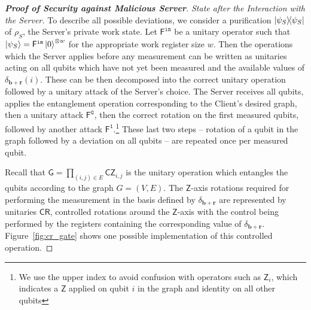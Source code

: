 \documentclass[12pt]{iopart}
\newcommand{\cptp}[1]{\mathsf{#1}} \newcommand{\pd}[1]{\mathcal{#1}}  \newcommand{\sch}[1]{\bm{#1}}
\newcommand{\Z}{\cptp{Z}}
\renewcommand{\1}{\mathds{1}}
\newcommand{\CZ}{\mathsf{CZ}}
\newcommand{\CR}{\mathsf{CR}}
\begin{document}
\begin{proof}[\bf Proof of Security against Malicious Server]
\textit{State after the Interaction with the Server.}
To describe all possible deviations, we consider a purification $\dyad{\psi_S}$ of $\rho_S$, the Server's private work state. Let $\cptp F^{\mathtt{in}}$ be a unitary operator such that $\ket{\psi_S} = \cptp F^{\mathtt{in}} \ket{0}^{\otimes w}$ for the appropriate work register size $w$. Then the operations which the Server applies before any measurement can be written as unitaries acting on all qubits which have not yet been measured and the available values of $\delta_{\bm{b} + \bm{r}}(i)$. These can be then decomposed into the correct unitary operation followed by a unitary attack of the Server's choice. The Server receives all qubits, applies the entanglement operation corresponding to the Client's desired graph, then a unitary attack $\cptp F^{\mathtt{G}}$, then the correct rotation on the first measured qubits, followed by another attack $\cptp F^{\mathtt{1}}$.\footnote{We use the upper index to avoid confusion with operators such as $\Z_i$, which indicates a $\Z$ applied on qubit $i$ in the graph and  identity on all other qubits} These last two steps -- rotation of a qubit in the graph followed by a deviation on all qubits -- are repeated once per measured qubit.

Recall that $\cptp G = \prod_{(i, j) \in E} \CZ_{i, j}$ is the unitary operation which entangles the qubits according to the graph $G = (V, E)$. The $\Z$-axis rotations required for performing the measurement in the basis defined by $\delta_{\bm{b} + \bm{r}}$ are represented by unitaries $\CR$, controlled rotations around the $\Z$-axis with the control being performed by the registers containing the corresponding value of $\delta_{\bm{b} + \bm{r}}$. Figure~\ref{fig:cr_gate} shows one possible implementation of this controlled operation.




\end{proof}
\end{document}
